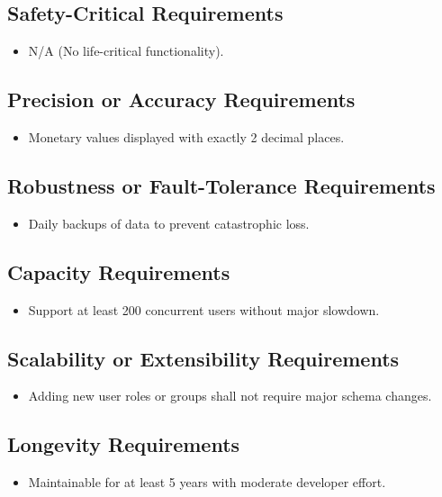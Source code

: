 \documentclass[12pt]{article}
\begin{document}
\subsection{Safety-Critical Requirements}
\begin{itemize}
  \item N/A (No life-critical functionality).
\end{itemize}

\subsection{Precision or Accuracy Requirements}
\begin{itemize}
    \item Monetary values displayed with exactly 2 decimal places.
\end{itemize}

\subsection{Robustness or Fault-Tolerance Requirements}
\begin{itemize}
    \item Daily backups of data to prevent catastrophic loss.
\end{itemize}

\subsection{Capacity Requirements}
\begin{itemize}
    \item Support at least 200 concurrent users without major slowdown.
\end{itemize}

\subsection{Scalability or Extensibility Requirements}
\begin{itemize}
    \item Adding new user roles or groups shall not require major schema changes.
\end{itemize}

\subsection{Longevity Requirements}
\begin{itemize}
    \item Maintainable for at least 5 years with moderate developer effort.
\end{itemize}
\end{document}
